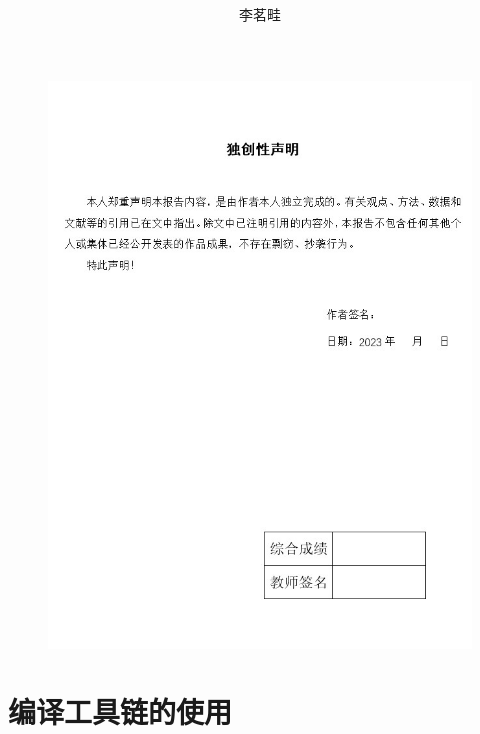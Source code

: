 \documentclass[supercite]{Experimental_Report}
\title{\ }
\author{李茗畦}
\theoremstyle{definition}
\begin{document}
\maketitle

\newpage
\thispagestyle{empty}
\mbox{}
\clearpage


\begin{figure}[H]
	\begin{center}
		\includegraphics[scale=1.30]{./images/shengming.jpg}
		\label{fig1-1}
	\end{center}
\end{figure}

\newpage
\thispagestyle{empty}
\mbox{}
\clearpage


\tableofcontents

\newpage
\thispagestyle{empty}
\mbox{}
\clearpage


\section{编译工具链的使用}
\end{document}
